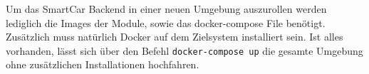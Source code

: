 Um das SmartCar Backend in einer neuen Umgebung auszurollen werden lediglich die Images der Module, sowie das docker-compose File benötigt. Zusätzlich muss natürlich Docker auf dem Zielsystem installiert sein. Ist alles vorhanden, lässt sich über den Befehl \texttt{docker-compose up} die gesamte Umgebung ohne zusätzlichen Installationen hochfahren.


  

 
 
 
 
 
 
 
 